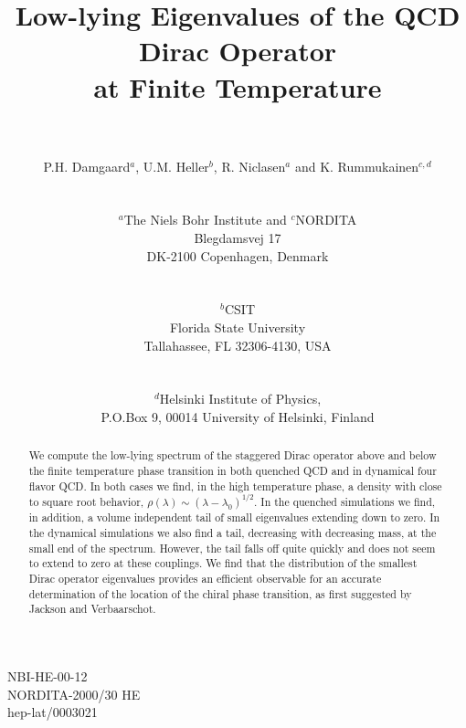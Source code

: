 \documentclass[11pt]{article}
\begin{document}
\topmargin -1.4cm
\oddsidemargin -0.8cm
\evensidemargin -0.8cm
\title{\Large{{\bf Low-lying Eigenvalues of the QCD Dirac Operator\\ 
at Finite Temperature }}}

\vspace{1.5cm}

\author{~\\~\\
{\sc P.H. Damgaard$^a$, U.M. Heller$^b$, R. Niclasen$^a$} and 
{\sc K. Rummukainen$^{c,d}$}\\~\\~\\
$^a$The Niels Bohr Institute and $^c$NORDITA\\ Blegdamsvej 17\\ 
DK-2100 Copenhagen, Denmark\\~\\~\\
$^b$CSIT\\Florida State University\\Tallahassee, FL 32306-4130, USA\\~\\~\\
$^d$Helsinki Institute of Physics,\\
P.O.Box 9, 00014 University of Helsinki, Finland\\}
\maketitle
\vfill
\begin{abstract} 
We compute the low-lying spectrum of the staggered Dirac operator above and
below the finite temperature phase transition in both quenched QCD and 
in dynamical four flavor QCD. In both cases we find,
in the high temperature phase, a density with close to square root
behavior, $\rho(\lambda) \sim (\lambda-\lambda_0)^{1/2}$.  In the
quenched simulations we find, in addition, a volume independent tail
of small eigenvalues extending down to zero.  In the dynamical
simulations we also find a tail, decreasing with decreasing mass, at
the small end of the spectrum. However, the tail falls off quite
quickly and does not seem to extend to zero at these couplings. 
We find that the distribution of the smallest Dirac operator eigenvalues 
provides an efficient observable for an accurate determination of the 
location of the chiral phase transition, as first suggested by Jackson and
Verbaarschot.
\end{abstract}
\vfill
\begin{flushleft}
NBI-HE-00-12 \\
NORDITA-2000/30 HE\\
hep-lat/0003021
\end{flushleft}
\thispagestyle{empty}
\newpage
\end{document}
